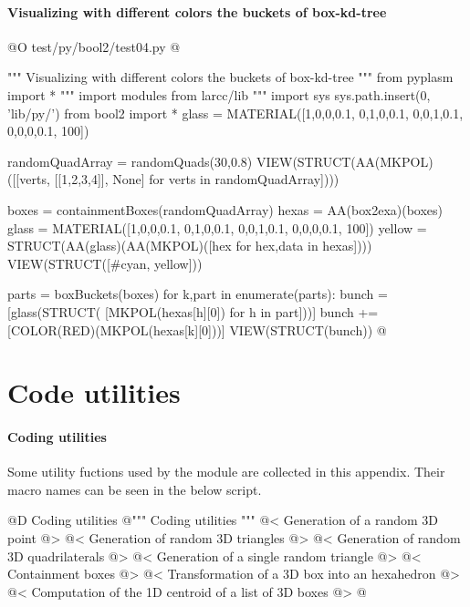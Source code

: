 \documentclass[11pt,oneside]{article}    %
\begin{document}
\paragraph{Visualizing with different colors the buckets of box-kd-tree}
@O test/py/bool2/test04.py @{
""" Visualizing with different colors the buckets of box-kd-tree """
from pyplasm import *
""" import modules from larcc/lib """
import sys
sys.path.insert(0, 'lib/py/')
from bool2 import *
glass = MATERIAL([1,0,0,0.1,  0,1,0,0.1,  0,0,1,0.1, 0,0,0,0.1, 100])

randomQuadArray = randomQuads(30,0.8)
VIEW(STRUCT(AA(MKPOL)([[verts, [[1,2,3,4]], None] for verts in randomQuadArray])))

boxes = containmentBoxes(randomQuadArray)
hexas = AA(box2exa)(boxes)
glass = MATERIAL([1,0,0,0.1,  0,1,0,0.1,  0,0,1,0.1, 0,0,0,0.1, 100])
yellow = STRUCT(AA(glass)(AA(MKPOL)([hex for hex,data in hexas])))
VIEW(STRUCT([#cyan,
    yellow]))

parts = boxBuckets(boxes)
for k,part in enumerate(parts):
    bunch = [glass(STRUCT( [MKPOL(hexas[h][0]) for h in part]))]
    bunch += [COLOR(RED)(MKPOL(hexas[k][0]))]
    VIEW(STRUCT(bunch))
@}


\appendix
\section{Code utilities}

\paragraph{Coding utilities}

Some utility fuctions used by the module are collected in this appendix. Their macro names can be seen in the below script.

@D Coding utilities
@{""" Coding utilities """
@< Generation of a random 3D point @>
@< Generation of random 3D triangles @>
@< Generation of random 3D quadrilaterals @>
@< Generation of a single random triangle @>
@< Containment boxes @>
@< Transformation of a 3D box into an hexahedron @>
@< Computation of the 1D centroid of a list of 3D boxes @>
@}
\end{document}
